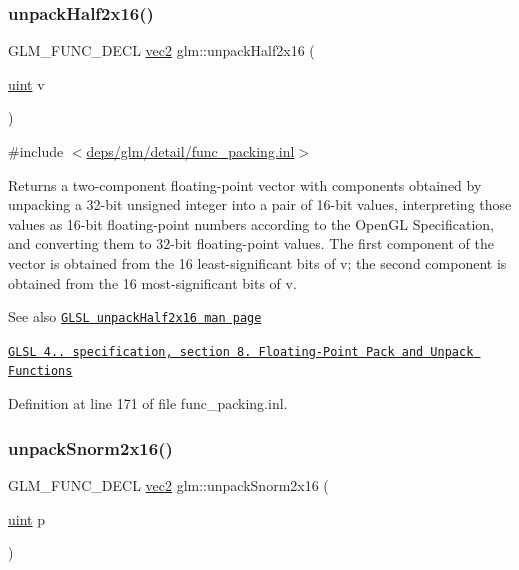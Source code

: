 \subsubsection{\texorpdfstring{unpack\+Half2x16()}{unpackHalf2x16()}}
{\footnotesize\ttfamily G\+L\+M\+\_\+\+F\+U\+N\+C\+\_\+\+D\+E\+CL \hyperlink{group__core__types_gaa1618f51db67eaa145db101d8c8431d8}{vec2} glm\+::unpack\+Half2x16 (\begin{DoxyParamCaption}\item[{\hyperlink{group__core__precision_ga4fd29415871152bfb5abd588334147c8}{uint}}]{v }\end{DoxyParamCaption})}



{\ttfamily \#include $<$\hyperlink{func__packing_8inl}{deps/glm/detail/func\+\_\+packing.\+inl}$>$}

Returns a two-\/component floating-\/point vector with components obtained by unpacking a 32-\/bit unsigned integer into a pair of 16-\/bit values, interpreting those values as 16-\/bit floating-\/point numbers according to the Open\+GL Specification, and converting them to 32-\/bit floating-\/point values. The first component of the vector is obtained from the 16 least-\/significant bits of v; the second component is obtained from the 16 most-\/significant bits of v.

\begin{DoxySeeAlso}{See also}
\href{http://www.opengl.org/sdk/docs/manglsl/xhtml/unpackHalf2x16.xml}{\tt G\+L\+SL unpack\+Half2x16 man page} 

\href{http://www.opengl.org/registry/doc/GLSLangSpec.4.20.8.pdf}{\tt G\+L\+SL 4.. specification, section 8. Floating-\/\+Point Pack and Unpack Functions} 
\end{DoxySeeAlso}


Definition at line 171 of file func\+\_\+packing.\+inl.

\mbox{\label{group__core__func__packing_gacd8f8971a3fe28418be0d0fa1f786b38}} 
\subsubsection{\texorpdfstring{unpack\+Snorm2x16()}{unpackSnorm2x16()}}
{\footnotesize\ttfamily G\+L\+M\+\_\+\+F\+U\+N\+C\+\_\+\+D\+E\+CL \hyperlink{group__core__types_gaa1618f51db67eaa145db101d8c8431d8}{vec2} glm\+::unpack\+Snorm2x16 (\begin{DoxyParamCaption}\item[{\hyperlink{group__core__precision_ga4fd29415871152bfb5abd588334147c8}{uint}}]{p }\end{DoxyParamCaption})}



